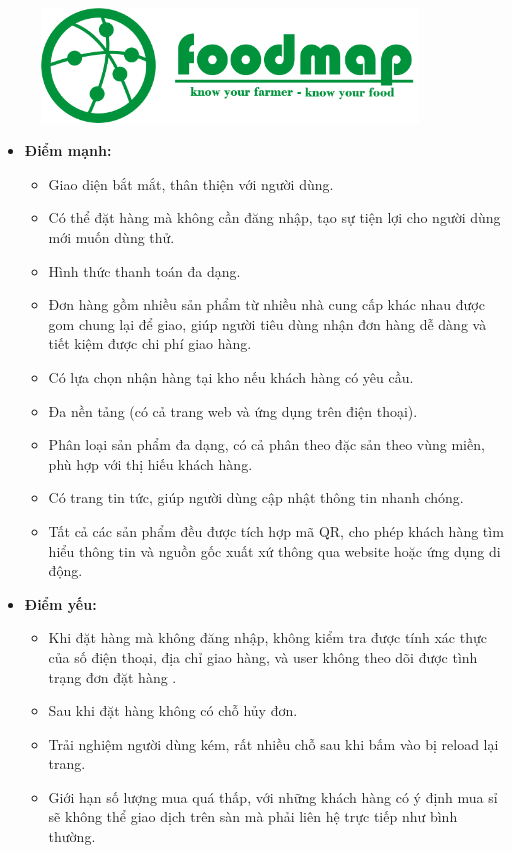 \begin{figure}[H]
    \begin{center}
    \includegraphics[width=10cm]{Images/foodmap.png}
    \end{center}
\end{figure}

\begin{itemize}
    \item \textbf {Điểm mạnh:}
        \begin{itemize}
            \item Giao diện bắt mắt, thân thiện với người dùng.
            \item Có thể đặt hàng mà không cần đăng nhập, tạo sự tiện lợi cho người dùng mới muốn dùng thử.
            \item Hình thức thanh toán đa dạng.
            \item Đơn hàng gồm nhiều sản phẩm từ nhiều nhà cung cấp khác nhau được gom chung lại để giao, giúp người tiêu dùng nhận đơn hàng dễ dàng và tiết kiệm được chi phí giao hàng.
            \item Có lựa chọn nhận hàng tại kho nếu khách hàng có yêu cầu.
            \item Đa nền tảng (có cả trang web và ứng dụng trên điện thoại).
            \item Phân loại sản phẩm đa dạng, có cả phân theo đặc sản theo vùng miền, phù hợp với thị hiếu khách hàng.
            \item Có trang tin tức, giúp người dùng cập nhật thông tin nhanh chóng.
            \item Tất cả các sản phẩm đều được tích hợp mã QR, cho phép khách hàng tìm hiểu thông tin và nguồn gốc xuất xứ thông qua website hoặc ứng dụng di động.
        \end{itemize}
    \item \textbf {Điểm yếu:}
        \begin{itemize}
            \item Khi đặt hàng mà không đăng nhập, không kiểm tra được tính xác thực của số điện thoại, địa chỉ giao hàng, và user không theo dõi được tình trạng đơn đặt hàng .
            \item Sau khi đặt hàng không có chỗ hủy đơn.
            \item Trải nghiệm người dùng kém, rất nhiều chỗ sau khi bấm vào bị reload lại trang.
            \item Giới hạn số lượng mua quá thấp, với những khách hàng có ý định mua sỉ sẽ không thể giao dịch trên sàn mà phải liên hệ trực tiếp như bình thường.
        \end{itemize}
\end{itemize}


